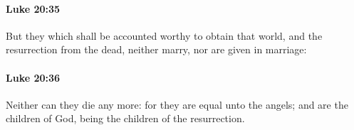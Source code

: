 		\paragraph{Luke 20:35} %
			\label{LUKE-20-35}

			But they which shall be accounted worthy to obtain that world, and the resurrection from the dead, neither marry, nor are given in marriage:

			\begin{framed}
			\scriptsize
				\begin{compactdesc}
					\item[SBLG] 
				\end{compactdesc}
			\end{framed}

		\paragraph{Luke 20:36} %
			\label{LUKE-20-36}

			Neither can they die any more: for they are equal unto the angels; and are the children of God, being the children of the resurrection.

